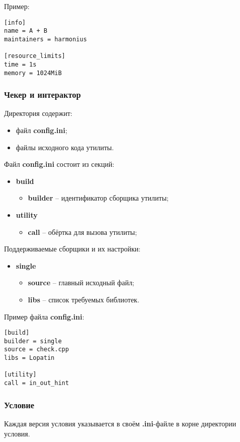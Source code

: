 Пример:
\begin{verbatim}
[info]
name = A + B
maintainers = harmonius

[resource_limits]
time = 1s
memory = 1024MiB
\end{verbatim}

\subsubsection{Чекер и интерактор}
Директория содержит:
\begin{itemize}
    \item файл \textbf{config.ini};
    \item файлы исходного кода утилиты.
\end{itemize}

Файл \textbf{config.ini} состоит из секций:
\begin{itemize}
    \item \textbf{build}
        \begin{itemize}
            \item \textbf{builder} -- идентификатор сборщика утилиты;
        \end{itemize}
    \item \textbf{utility}
        \begin{itemize}
            \item \textbf{call} -- обёртка для вызова утилиты;
        \end{itemize}
\end{itemize}

Поддерживаемые сборщики и их настройки:
\begin{itemize}
    \item \textbf{single}
        \begin{itemize}
            \item \textbf{source} -- главный исходный файл;
            \item \textbf{libs} -- список требуемых библиотек.
        \end{itemize}
\end{itemize}

Пример файла \textbf{config.ini}:
\begin{verbatim}
[build]
builder = single
source = check.cpp
libs = Lopatin

[utility]
call = in_out_hint
\end{verbatim}

\subsubsection{Условие}
Каждая версия условия указывается в своём \textbf{.ini}-файле
в корне директории условия.

